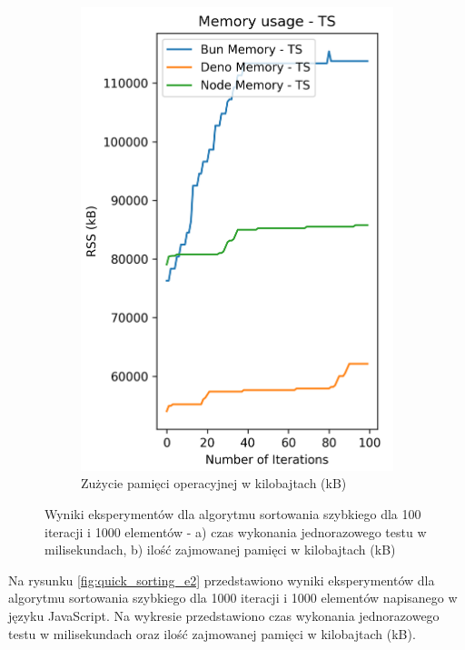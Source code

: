\begin{figure}[H]
\begin{subfigure}[b]{0.4\textwidth}
    \includegraphics[width=\textwidth]{Figures/sorting/sorting_quick_100_1000_ts_memory.png}
    \caption{Zużycie pamięci operacyjnej w kilobajtach (kB)}
    \label{fig:quick_sorting_e1_ts_memory}
  \end{subfigure}
  \caption{Wyniki eksperymentów dla algorytmu sortowania szybkiego dla 100 iteracji i 1000 elementów - a) czas wykonania jednorazowego testu w milisekundach, b) ilość zajmowanej pamięci w kilobajtach (kB)}
  \label{fig:quick_sorting_e1_ts}
\end{figure}

Na rysunku \ref{fig:quick_sorting_e2} przedstawiono wyniki eksperymentów dla algorytmu sortowania szybkiego dla 1000 iteracji i 1000 elementów napisanego w języku JavaScript. Na wykresie przedstawiono czas wykonania jednorazowego testu w milisekundach oraz ilość zajmowanej pamięci w kilobajtach (kB).

